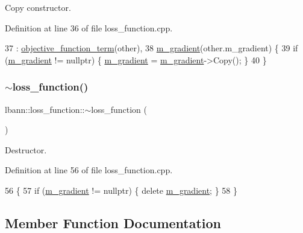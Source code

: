 Copy constructor. 

Definition at line 36 of file loss\+\_\+function.\+cpp.


\begin{DoxyCode}
37   : \hyperlink{classlbann_1_1objective__function__term_a8c019e3c880f38dc20275e395acaeca1}{objective\_function\_term}(other),
38     \hyperlink{classlbann_1_1loss__function_ac6ac9f8f2cef7a4daa1b282dba914975}{m\_gradient}(other.m\_gradient) \{
39   \textcolor{keywordflow}{if} (\hyperlink{classlbann_1_1loss__function_ac6ac9f8f2cef7a4daa1b282dba914975}{m\_gradient} != \textcolor{keyword}{nullptr}) \{ \hyperlink{classlbann_1_1loss__function_ac6ac9f8f2cef7a4daa1b282dba914975}{m\_gradient} = \hyperlink{classlbann_1_1loss__function_ac6ac9f8f2cef7a4daa1b282dba914975}{m\_gradient}->Copy(); \}
40 \}
\end{DoxyCode}
\mbox{\label{classlbann_1_1loss__function_a21c59d9c3db798c330ff8297f6374747}} 
\subsubsection{\texorpdfstring{$\sim$loss\+\_\+function()}{~loss\_function()}}
{\footnotesize\ttfamily lbann\+::loss\+\_\+function\+::$\sim$loss\+\_\+function (\begin{DoxyParamCaption}{ }\end{DoxyParamCaption})\hspace{0.3cm}{\ttfamily [override]}}

Destructor. 

Definition at line 56 of file loss\+\_\+function.\+cpp.


\begin{DoxyCode}
56                               \{
57   \textcolor{keywordflow}{if} (\hyperlink{classlbann_1_1loss__function_ac6ac9f8f2cef7a4daa1b282dba914975}{m\_gradient} != \textcolor{keyword}{nullptr}) \{ \textcolor{keyword}{delete} \hyperlink{classlbann_1_1loss__function_ac6ac9f8f2cef7a4daa1b282dba914975}{m\_gradient}; \}
58 \}
\end{DoxyCode}


\subsection{Member Function Documentation}
\mbox{\label{classlbann_1_1loss__function_acd6e3bdcf33235208db03ab7af88e961}} 
